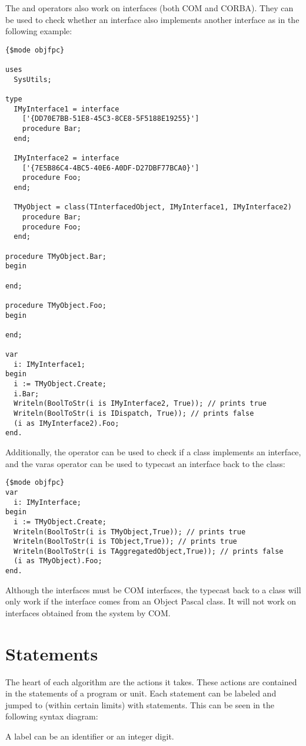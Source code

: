 The  and  operators also work on interfaces (both COM and
CORBA). They can be used to check whether an interface also implements another interface as in
the following example:
\begin{verbatim}
{$mode objfpc}

uses
  SysUtils;

type
  IMyInterface1 = interface
    ['{DD70E7BB-51E8-45C3-8CE8-5F5188E19255}']
    procedure Bar;
  end;

  IMyInterface2 = interface
    ['{7E5B86C4-4BC5-40E6-A0DF-D27DBF77BCA0}']
    procedure Foo;
  end;

  TMyObject = class(TInterfacedObject, IMyInterface1, IMyInterface2)
    procedure Bar;
    procedure Foo;
  end;

procedure TMyObject.Bar;
begin

end;

procedure TMyObject.Foo;
begin

end;

var
  i: IMyInterface1;
begin
  i := TMyObject.Create;
  i.Bar;
  Writeln(BoolToStr(i is IMyInterface2, True)); // prints true
  Writeln(BoolToStr(i is IDispatch, True)); // prints false
  (i as IMyInterface2).Foo;
end.
\end{verbatim}

Additionally, the  operator can be used to check if a class
implements an interface, and the var{as} operator can be used to typecast an
interface back to the class:
\begin{verbatim}
{$mode objfpc}
var
  i: IMyInterface;
begin
  i := TMyObject.Create;
  Writeln(BoolToStr(i is TMyObject,True)); // prints true
  Writeln(BoolToStr(i is TObject,True)); // prints true
  Writeln(BoolToStr(i is TAggregatedObject,True)); // prints false
  (i as TMyObject).Foo;
end.
\end{verbatim}
Although the interfaces must be COM interfaces, the typecast back to a 
class will only work if the interface comes from an Object Pascal class. 
It will not work on interfaces obtained from the system by COM.

\chapter{Statements}
\label{ch:Statements}
The heart of each algorithm are the actions it takes. These actions are
contained in the statements of a program or unit. Each statement can be
labeled and jumped to (within certain limits) with  statements.
This can be seen in the following syntax diagram:

A label can be an identifier or an integer digit.

